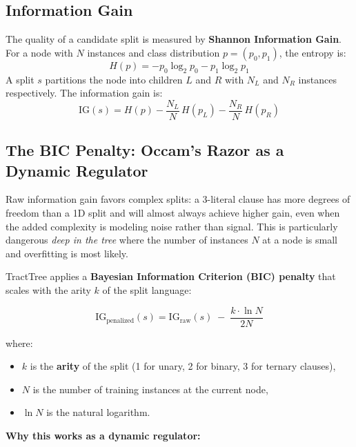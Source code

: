 \documentclass[11pt,a4paper]{article}
\begin{document}
\subsection{Information Gain}

The quality of a candidate split is measured by \textbf{Shannon Information Gain}. For a node with $N$ instances and class distribution $p = (p_0, p_1)$, the entropy is:
$$
H(p) = -p_0 \log_2 p_0 - p_1 \log_2 p_1
$$
A split $s$ partitions the node into children $L$ and $R$ with $N_L$ and $N_R$ instances respectively. The information gain is:
$$
\mathrm{IG}(s) = H(p) - \frac{N_L}{N}\,H(p_L) - \frac{N_R}{N}\,H(p_R)
$$

\subsection{The BIC Penalty: Occam's Razor as a Dynamic Regulator}

Raw information gain favors complex splits: a 3-literal clause has more degrees of freedom than a 1D split and will almost always achieve higher gain, even when the added complexity is modeling noise rather than signal. This is particularly dangerous \emph{deep in the tree} where the number of instances $N$ at a node is small and overfitting is most likely.

TractTree applies a \textbf{Bayesian Information Criterion (BIC) penalty} that scales with the arity $k$ of the split language:

\begin{equation}
\mathrm{IG}_{\mathrm{penalized}}(s) = \mathrm{IG}_{\mathrm{raw}}(s) \;-\; \frac{k \cdot \ln N}{2N}
\label{eq:bic}
\end{equation}

\noindent where:
\begin{itemize}[leftmargin=2em]
    \item $k$ is the \textbf{arity} of the split (1 for unary, 2 for binary, 3 for ternary clauses),
    \item $N$ is the number of training instances at the current node,
    \item $\ln N$ is the natural logarithm.
\end{itemize}

\textbf{Why this works as a dynamic regulator:}
\end{document}
